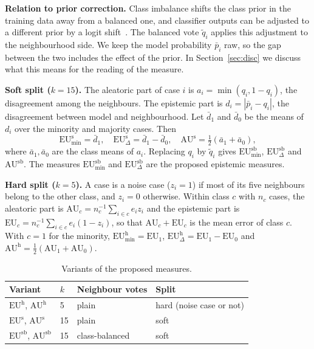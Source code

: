 \documentclass[preprint,12pt]{elsarticle}
\newcommand{\EUmin}[1]{\mathrm{EU}^{\mathrm{#1}}_{\min}}
\newcommand{\EUdif}[1]{\mathrm{EU}^{\mathrm{#1}}_{\Delta}}
\newcommand{\AUbal}[1]{\mathrm{AU}^{\mathrm{#1}}}
\begin{document}
\textbf{Relation to prior correction.} Class imbalance shifts the class prior in the training data away from a balanced one, and classifier outputs can be adjusted to a different prior by a logit shift~\cite{Elkan2001,Saerens2002}. The balanced vote $\tilde q_i$ applies this adjustment to the neighbourhood side. We keep the model probability $\bar p_i$ raw, so the gap between the two includes the effect of the prior. In Section~\ref{sec:disc} we discuss what this means for the reading of the measure.

\textbf{Soft split ($k=15$).} The aleatoric part of case $i$ is $a_i=\min(q_i,1-q_i)$, the disagreement among the neighbours. The epistemic part is $d_i=|\bar p_i-q_i|$, the disagreement between model and neighbourhood. Let $\bar d_1$ and $\bar d_0$ be the means of $d_i$ over the minority and majority cases. Then
\begin{equation}
\EUmin{s}=\bar d_1,\quad \EUdif{s}=\bar d_1-\bar d_0,\quad \AUbal{s}=\tfrac12(\bar a_1+\bar a_0),
\end{equation}
where $\bar a_1,\bar a_0$ are the class means of $a_i$. Replacing $q_i$ by $\tilde q_i$ gives $\EUmin{sb}$, $\EUdif{sb}$ and $\AUbal{sb}$. The measures $\EUmin{sb}$ and $\EUdif{sb}$ are the proposed epistemic measures.

\textbf{Hard split ($k=5$).} A case is a noise case ($z_i=1$) if most of its five neighbours belong to the other class, and $z_i=0$ otherwise. Within class $c$ with $n_c$ cases, the aleatoric part is $\mathrm{AU}_c=n_c^{-1}\sum_{i\in c} e_i z_i$ and the epistemic part is $\mathrm{EU}_c=n_c^{-1}\sum_{i\in c} e_i(1-z_i)$, so that $\mathrm{AU}_c+\mathrm{EU}_c$ is the mean error of class $c$. With $c=1$ for the minority, $\EUmin{h}=\mathrm{EU}_1$, $\EUdif{h}=\mathrm{EU}_1-\mathrm{EU}_0$ and $\AUbal{h}=\tfrac12(\mathrm{AU}_1+\mathrm{AU}_0)$.

\begin{table}[H]
\centering
\caption{Variants of the proposed measures.}\label{tab:variants}
\begin{tabular}{llll}
\toprule
Variant & $k$ & Neighbour votes & Split \\
\midrule
$\mathrm{EU}^{\mathrm{h}}$, $\mathrm{AU}^{\mathrm{h}}$ & 5 & plain & hard (noise case or not) \\
$\mathrm{EU}^{\mathrm{s}}$, $\mathrm{AU}^{\mathrm{s}}$ & 15 & plain & soft \\
$\mathrm{EU}^{\mathrm{sb}}$, $\mathrm{AU}^{\mathrm{sb}}$ & 15 & class-balanced & soft \\
\bottomrule
\end{tabular}
\end{table}
\end{document}
